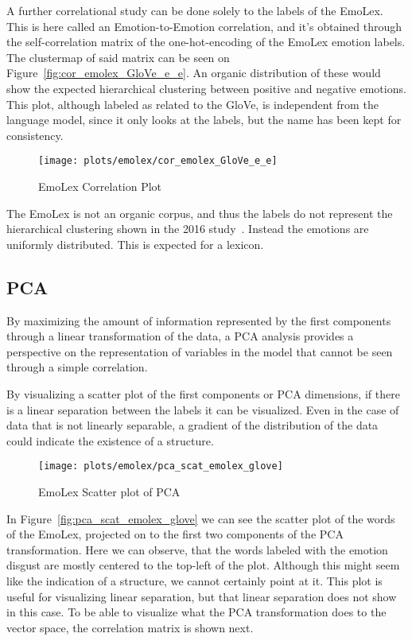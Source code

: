 A further correlational study can be done solely to the labels of the EmoLex. This is here called an Emotion-to-Emotion correlation, and it's obtained through the self-correlation matrix of the one-hot-encoding of the EmoLex emotion labels. The clustermap of said matrix can be seen on Figure~\ref{fig:cor_emolex_GloVe_e_e}. An organic distribution of these would show the expected hierarchical clustering between positive and negative emotions. This plot, although labeled as related to the GloVe, is independent from the language model, since it only looks at the labels, but the name has been kept for consistency.

\begin{figure}[H]
  \texttt{[image: plots/emolex/cor\_emolex\_GloVe\_e\_e]}
  \centering
  \caption{EmoLex Correlation Plot}
\end{figure}\label{fig:cor_emolex_GloVe_e_e}

The EmoLex is not an organic corpus, and thus the labels do not represent the hierarchical clustering shown in the 2016 study~\cite{barradas2016thesis}. Instead the emotions are uniformly distributed. This is expected for a lexicon.

\subsection{PCA}
By maximizing the amount of information represented by the first components through a linear transformation of the data, a PCA analysis provides a perspective on the representation of variables in the model that cannot be seen through a simple correlation.

By visualizing a scatter plot of the first components or PCA dimensions, if there is a linear separation between the labels it can be visualized. Even in the case of data that is not linearly separable, a gradient of the distribution of the data could indicate the existence of a structure.

\begin{figure}[H]
  \texttt{[image: plots/emolex/pca\_scat\_emolex\_glove]}
  \centering
  \caption{EmoLex Scatter plot of PCA}
\end{figure}\label{fig:pca_scat_emolex_glove}

In Figure~\ref{fig:pca_scat_emolex_glove} we can see the scatter plot of the words of the EmoLex, projected on to the first two components of the PCA transformation. Here we can observe, that the words labeled with the emotion disgust are mostly centered to the top-left of the plot. Although this might seem like the indication of a structure, we cannot certainly point at it. This plot is useful for visualizing linear separation, but that linear separation does not show in this case. To be able to visualize what the PCA transformation does to the vector space, the correlation matrix is shown next.

